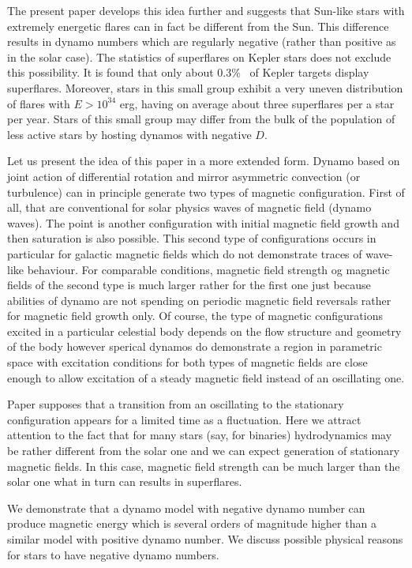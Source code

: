 \documentclass[fleqn,12pt]{SelfArx} %
\begin{document}
The present paper develops this idea further and suggests that Sun-like stars with extremely energetic flares can 
in fact be different from the Sun. This difference results in dynamo numbers which are regularly negative (rather 
than positive as in the solar case).
The statistics of superflares on Kepler stars does not exclude this possibility. It is found \cite{4,13}  that only 
about 0.3\%~ of Kepler targets display superflares. 
Moreover, stars in this small group exhibit a very uneven distribution of flares with $E > 10^{34}$ erg, having on 
average about three superflares per a star per year. 
Stars of this small group may differ from the bulk of the population of less active stars by hosting dynamos with 
negative $D$.

Let us present the idea of this paper in a more extended form. Dynamo based on joint action of differential 
rotation and mirror asymmetric convection (or turbulence) can in principle generate two types of magnetic 
configuration. First of all, that are conventional for solar physics waves of magnetic field (dynamo waves). The 
point is another configuration with initial magnetic field growth and then saturation is also possible. This 
second type of configurations  occurs in particular for galactic magnetic fields which do not demonstrate traces 
of wave-like behaviour. For comparable conditions, magnetic field strength og magnetic fields of the second type 
is much larger rather for the first one just because abilities of dynamo are not spending on periodic magnetic 
field reversals rather for magnetic field growth only.   Of course, the type of magnetic configurations excited 
in a particular celestial body depends on the flow structure and geometry of the body however sperical dynamos do 
demonstrate a region in parametric space with excitation conditions for both types of magnetic fields are close 
enough to allow excitation of a steady magnetic field instead of an oscillating one. 

Paper \cite{1} supposes that a transition from an oscillating to the stationary configuration appears for a limited 
time as a fluctuation. Here we attract attention to the fact that for many stars (say, for binaries) 
hydrodynamics may be rather different from the solar one and we can expect generation of stationary magnetic 
fields. In this case, magnetic field strength can be much larger than the solar one what in turn  can results in 
superflares. 

We demonstrate that a dynamo model with negative dynamo number can produce magnetic energy which is several 
orders of magnitude higher than a similar model with positive dynamo number. We discuss possible physical reasons 
for stars to have  negative dynamo numbers.
\end{document}

